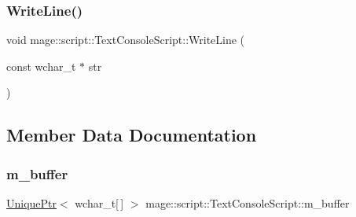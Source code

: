 \hypertarget{classmage_1_1script_1_1_text_console_script_a5eac390dafa0570785e7a936df0ca0ce}{}\label{classmage_1_1script_1_1_text_console_script_a5eac390dafa0570785e7a936df0ca0ce} 
\subsubsection{\texorpdfstring{Write\+Line()}{WriteLine()}}
{\footnotesize\ttfamily void mage\+::script\+::\+Text\+Console\+Script\+::\+Write\+Line (\begin{DoxyParamCaption}\item[{const wchar\+\_\+t $\ast$}]{str }\end{DoxyParamCaption})}



\subsection{Member Data Documentation}
\hypertarget{classmage_1_1script_1_1_text_console_script_a35db160ce89d4ebf6f184d2fe850beab}{}\label{classmage_1_1script_1_1_text_console_script_a35db160ce89d4ebf6f184d2fe850beab} 
\subsubsection{\texorpdfstring{m\+\_\+buffer}{m\_buffer}}
{\footnotesize\ttfamily \hyperlink{namespacemage_a3316d7143a973e37adf1110f2e80ca31}{Unique\+Ptr}$<$ wchar\+\_\+t\mbox{[}$\,$\mbox{]} $>$ mage\+::script\+::\+Text\+Console\+Script\+::m\+\_\+buffer\hspace{0.3cm}{\ttfamily [private]}}

\hypertarget{classmage_1_1script_1_1_text_console_script_a10d396ae897b441a7cfc1f77c50eb16e}{}\label{classmage_1_1script_1_1_text_console_script_a10d396ae897b441a7cfc1f77c50eb16e} 
